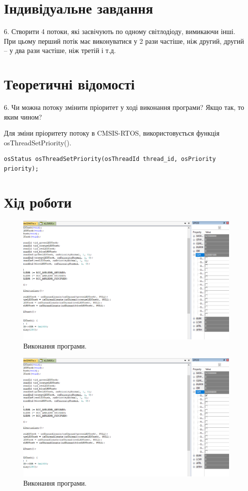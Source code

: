 \documentclass[oneside,14pt]{extarticle}
\begin{document}
\begin{normalsize}
	\section*{Індивідуальне завдання}
	6. Створити 4 потоки, які засвічують по одному світлодіоду, вимикаючи інші. При цьому перший потік має виконуватися у 2 рази частіше, ніж другий, другий – у два рази частіше, ніж третій і т.д.

	\section*{Теоретичні відомості}
	6. Чи можна потоку змінити пріоритет у ході виконання програми? Якщо так, то яким чином?
	
	Для зміни пріоритету потоку в CMSIS-RTOS, використовується функція osThreadSetPriority().
	
	\begin{lstlisting}
osStatus osThreadSetPriority(osThreadId thread_id, osPriority priority);	\end{lstlisting}
	
	\section*{Хід роботи}
	\begin{figure}[H]
		\centering
		\includegraphics[scale=0.45]{1}
		\caption{Виконання програми.}
	\end{figure}

	\begin{figure}[H]
		\centering
		\includegraphics[scale=0.45]{2}
		\caption{Виконання програми.}
	\end{figure}
	

\end{normalsize}
\end{document}
